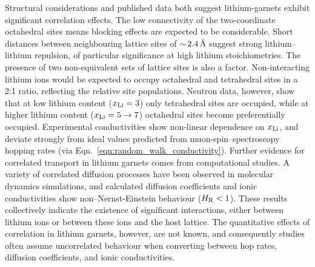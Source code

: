 \documentclass[aps,prb,twocolumn,superscriptaddress,reprint]{revtex4-1}
\newcommand{\xLi}{x_\m{Li}}
\newcommand{\angstrom}{\mbox{\normalfont\AA}}
\begin{document}
Structural considerations and published data both suggest lithium-garnets  exhibit significant correlation effects. The low connectivity of the two-coordinate octahedral sites means blocking effects are expected to be considerable.\cite{AwakaEtAl_ChemLett2011} Short distances between neighbouring lattice sites of $\sim\!2.4\,\mathrm{\angstrom}$ suggest strong lithium--lithium repulsion, of particular significance at high lithium stoichiometries.\cite{OCallaghanAndCussen_ChemComm2007,OCallaghanAndCussen_SolStatSci2008,Cussen_JMaterChem2010,WangEtAl_SolStatIonics2014} The presence of two non-equivalent sets of lattice sites is also a factor. Non-interacting lithium ions would be expected to occupy octahedral and tetrahedral sites in a 2:1 ratio, reflecting the relative site populations. 
Neutron data, however, show that at low lithium content ($\xLi=3$) only tetrahedral sites are occupied,\cite{OCallaghanEtAl_ChemMater2006} while at higher lithium content ($\xLi=5\to7$) octahedral sites become preferentially occupied.\cite{Cussen_JMaterChem2010,ThangaduraiEtAl_JPhysChemLett2015} Experimental conductivities show non-linear dependence on $\xLi$,\cite{ThompsonEtAl_AdvEnergyMater2015} and deviate strongly from ideal values predicted from muon-spin--spectroscopy hopping rates (via Eqn.~\ref{eqn:random_walk_conductivity}).\cite{NozakiEtAl_SolStatIonics2014} Further evidence for correlated transport in lithium garnets comes from computational studies. A variety of correlated diffusion processes have been observed in molecular dynamics simulations,\cite{JalemEtAl_ChemMater2013, MeierEtAl_JPhysChemC2014,KlenkAndLai_PhysChemChemPhys2015, BurbanoEtAl_PhysRevLett2016} and calculated diffusion coefficients and ionic conductivities show non--Nernst-Einstein behaviour ($H_{\mathrm{R}}<1$).\cite{KlenkAndLai_SolStatIonics2016} These results collectively indicate the existence of significant interactions, either between lithium ions or between these ions and the host lattice. The quantitative effects of correlation in lithium garnets, however, are not known, and consequently studies often assume uncorrelated behaviour when converting between hop rates, diffusion coefficients, and ionic conductivities.\cite{KuhnEtAl_PhysRevB2011,KuhnEtAl_JPhys-CondensMat2011,MiaraEtAl_ChemMater2013,Rustad_arXiv2016,GuEtAl_SolStatIonics2015,NozakiEtAl_SolStatIonics2014,ZeierEtAl_ACSApplMaterInt2014,JalemEtAl_ChemMater2013,AdamsAndRao_JMaterChem2012,DuvelEtAl_JPhysChemC2012,NarayananEtAl_RSCAdv2012,RamzyAndThangadurai_ACSApplMaterInt2010,AmoresEtAl_JMaterChemA2016}
\end{document}
